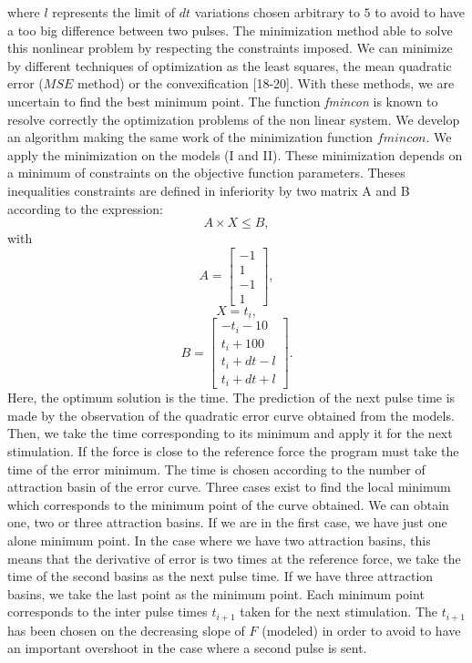 \documentclass[10pt,twocolumn,letterpaper, 
]{article}
\begin{document}
	where $l$ represents the limit of $dt$ variations chosen arbitrary to $5$ to avoid to have a too big difference between two pulses. 
The minimization method able to solve this nonlinear problem by respecting the constraints imposed. We can minimize by different techniques of optimization as the least squares, the mean quadratic error ($MSE$ method) or the convexification [18-20]. With these methods, we are uncertain to find the best minimum point. The function \textit{fmincon} is known to resolve correctly the optimization problems of the non linear system. We develop an algorithm making the same work of the minimization function $fmincon$. We apply the minimization on the models (I and II). These minimization depends on a minimum of constraints on the objective function parameters. Theses inequalities constraints are defined in inferiority by two matrix A and B according to the expression: 
	\begin{equation} A\times X\leq B, \end{equation} 
	with \begin{equation}
				A=\begin{bmatrix} -1\\1\\-1\\1 \end{bmatrix},
				\end{equation}
				\begin{equation}
				X=t_i,
				\end{equation}
				\begin{equation}
				B=\begin{bmatrix}-t_{i}-10\\t_{i}+100\\t_{i}+dt-l\\t_{i}+dt+l
				\end{bmatrix}.				
	     \end{equation}
Here, the optimum solution is the time. The prediction of the next pulse time is made by the observation of the quadratic error curve obtained from the models. Then, we take the time corresponding to its minimum and apply it for the next stimulation. If the force is close to the reference force the program must take the time of the error minimum. The time is chosen according to the number of attraction basin of the error curve. Three cases exist to find the local minimum which corresponds to the minimum point of the curve obtained. We can obtain one, two or three attraction basins. If we are in the first case, we have just one alone minimum point. In the case where we have two attraction basins, this means that the derivative of error is two times at the reference force, we take the time of the second basins as the next pulse time. If we have three attraction basins, we take the last point as the minimum point. Each minimum point corresponds to the inter pulse times $t_{i+1}$ taken for the next stimulation. The $t_{i+1}$ has been chosen on the decreasing slope of $F$ (modeled) in order to avoid to have an important overshoot in the case where a second pulse is sent.  
\end{document}
